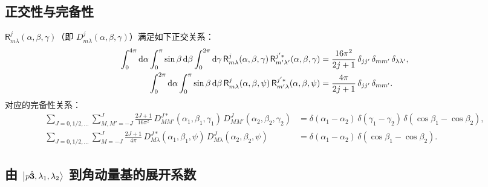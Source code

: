 \subsection{正交性与完备性}

$\mathsf{R}^{j}_{m\lambda}(\alpha,\beta,\gamma)$（即 $D^{j}_{m\lambda}(\alpha,\beta,\gamma)$）满足如下正交关系：
\begin{align}
  \int_0^{4\pi}\mathrm{d}\alpha\int_0^{\pi}\sin\beta\,\mathrm{d}\beta\int_0^{2\pi}\mathrm{d}\gamma\,
    \mathsf{R}^{j}_{m\lambda}(\alpha,\beta,\gamma)\,\mathsf{R}^{j'*}_{m'\lambda'}(\alpha,\beta,\gamma)
  &= \frac{16\pi^2}{2j+1}\,\delta_{jj'}\,\delta_{mm'}\,\delta_{\lambda\lambda'},
  \label{eq:Dorth-1}\\
  \int_0^{2\pi}\mathrm{d}\alpha\int_0^{\pi}\sin\beta\,\mathrm{d}\beta\,
    \mathsf{R}^{j}_{m\lambda}(\alpha,\beta,\psi)\,\mathsf{R}^{j'*}_{m'\lambda}(\alpha,\beta,\psi)
  &= \frac{4\pi}{2j+1}\,\delta_{jj'}\,\delta_{mm'}.
  \label{eq:Dorth-2}
\end{align}
对应的完备性关系：
\begin{align}
  \sum_{J=0,1/2,\dots}\sum_{M,M'=-J}^{J}\frac{2J+1}{16\pi^2}\,
    D^{J*}_{MM'}(\alpha_1,\beta_1,\gamma_1)\,D^{J}_{MM'}(\alpha_2,\beta_2,\gamma_2)
  &= \delta(\alpha_1-\alpha_2)\,\delta(\gamma_1-\gamma_2)\,\delta(\cos\beta_1-\cos\beta_2),
  \label{eq:Dcomp-1}\\
  \sum_{J=0,1/2,\dots}\sum_{M=-J}^{J}\frac{2J+1}{4\pi}\,
    D^{J*}_{M\lambda}(\alpha_1,\beta_1,\psi)\,D^{J}_{M\lambda}(\alpha_2,\beta_2,\psi)
  &= \delta(\alpha_1-\alpha_2)\,\delta(\cos\beta_1-\cos\beta_2).
  \label{eq:Dcomp-2}
\end{align}

\subsection{由 $\ket{p\hat{\bm 3},\lambda_1,\lambda_2}$ 到角动量基的展开系数}

